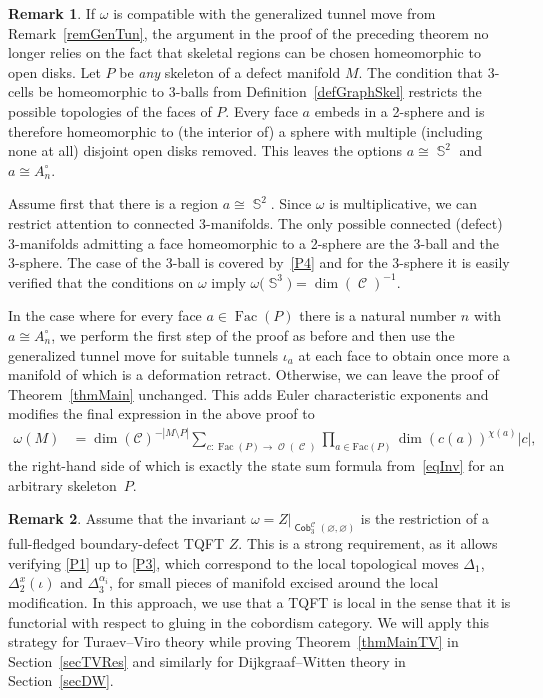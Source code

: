 \documentclass[10pt,a4paper]{amsart}
\DeclareMathOperator{\Sp}{\mathbb{S}}
\DeclareMathOperator{\Cob}{\mathsf{Cob}}
\DeclareMathOperator{\calc}{\mathcal{C}}
\DeclareMathOperator{\calo}{\mathcal{O}}
\DeclareMathOperator{\Fac}{\mathrm{Fac}}
\numberwithin{equation}{section}
\theoremstyle{definition}
\newtheorem{Remark}[Remark]{Remark}
\begin{document}
\begin{Remark} \label{remSkelTun}
 If $\omega$ is compatible with the generalized tunnel move from Remark~\ref{remGenTun}, the argument in the proof of the preceding theorem no longer relies on the fact that skeletal regions can be chosen homeomorphic to open disks. Let $P$ be \textit{any} skeleton of a defect manifold $M$. The condition that 3-cells be homeomorphic to 3-balls from Definition~\ref{defGraphSkel} restricts the possible topologies of the faces of $P$. Every face $a$ embeds in a 2-sphere and is therefore homeomorphic to (the interior of) a sphere with multiple (including none at all) disjoint open disks removed. This leaves the options $a \cong \Sp^2$ and $a \cong A_n^{\circ}$.

 Assume first that there is a region $a \cong \Sp^2$. Since $\omega$ is multiplicative, we can restrict attention to connected 3-manifolds. The only possible connected (defect) 3-manifolds admitting a face homeomorphic to a 2-sphere are the 3-ball and the 3-sphere. The case of the 3-ball is covered by~\ref{P4} and for the 3-sphere it is easily verified that the conditions on $\omega$ imply $\omega\bigl(\Sp^3\bigr) = \dim(\calc)^{-1}$.

 In the case where for every face $a \in \Fac(P)$ there is a natural number $n$ with $a \cong A_n^{\circ}$, we perform the first step of the proof as before and then use the generalized tunnel move  for suitable tunnels $\iota_a$ at each face to obtain once more a manifold of which  is a deformation retract. Otherwise, we can leave the proof of Theorem~\ref{thmMain} unchanged. This adds Euler characteristic exponents and modifies the final expression in the above proof to
 \begin{align*}
 \omega(M) &= \dim(\mathcal{C})^{-|M\setminus P|}\sum_{c\colon \Fac(P) \rightarrow \calo(\calc)} \prod_{a \in \mathrm{Fac}(P)}\dim(c(a))^{\chi(a)} |c|,
 \end{align*}
 the right-hand side of which is exactly the state sum formula from~\eqref{eqInv} for an arbitrary skeleton~$P$.
\end{Remark}

\begin{Remark}
 Assume that the invariant $\omega = Z|_{\Cob_3^{\calc}(\varnothing, \varnothing)}$ is the restriction of a full-fledged boundary-defect TQFT $Z$. This is a strong requirement, as it allows verifying \ref{P1} up to \ref{P3}, which correspond to the local topological moves $\Delta_1$, $\Delta_2^x(\iota)$ and $\Delta_3^{\alpha_i}$, for small pieces of manifold excised around the local modification. In this approach, we use that a TQFT is local in the sense that it is functorial with respect to gluing in the cobordism category. We will apply this strategy for Turaev--Viro theory while proving Theorem~\ref{thmMainTV} in Section~\ref{secTVRes} and similarly for Dijkgraaf--Witten theory in Section~\ref{secDW}.
\end{Remark}
\end{document}
